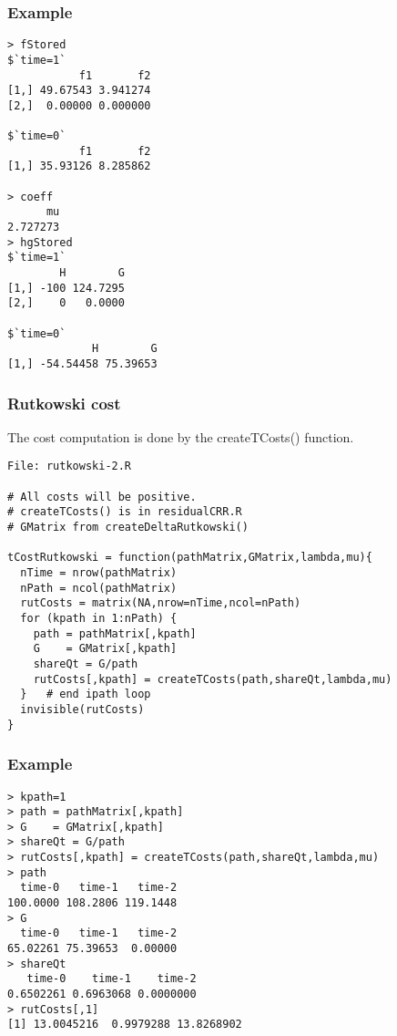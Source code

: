 \documentclass[10pt]{article}
\begin{document}
\subsubsection*{Example}

\begin{verbatim}
> fStored
$`time=1`
           f1       f2
[1,] 49.67543 3.941274
[2,]  0.00000 0.000000

$`time=0`
           f1       f2
[1,] 35.93126 8.285862

> coeff
      mu
2.727273
> hgStored
$`time=1`
        H        G
[1,] -100 124.7295
[2,]    0   0.0000

$`time=0`
             H        G
[1,] -54.54458 75.39653
\end{verbatim}



\subsubsection*{Rutkowski cost}

The cost computation is done by the createTCosts() function.

\begin{verbatim}
File: rutkowski-2.R

# All costs will be positive.
# createTCosts() is in residualCRR.R
# GMatrix from createDeltaRutkowski()

tCostRutkowski = function(pathMatrix,GMatrix,lambda,mu){
  nTime = nrow(pathMatrix)
  nPath = ncol(pathMatrix)
  rutCosts = matrix(NA,nrow=nTime,ncol=nPath)
  for (kpath in 1:nPath) {
    path = pathMatrix[,kpath]
    G    = GMatrix[,kpath]
    shareQt = G/path
    rutCosts[,kpath] = createTCosts(path,shareQt,lambda,mu)
  }   # end ipath loop
  invisible(rutCosts)
}
\end{verbatim}

\subsubsection*{Example}

\begin{verbatim}
> kpath=1
> path = pathMatrix[,kpath]
> G    = GMatrix[,kpath]
> shareQt = G/path
> rutCosts[,kpath] = createTCosts(path,shareQt,lambda,mu)
> path
  time-0   time-1   time-2
100.0000 108.2806 119.1448
> G
  time-0   time-1   time-2
65.02261 75.39653  0.00000
> shareQt
   time-0    time-1    time-2
0.6502261 0.6963068 0.0000000
> rutCosts[,1]
[1] 13.0045216  0.9979288 13.8268902
\end{verbatim}
\end{document}
